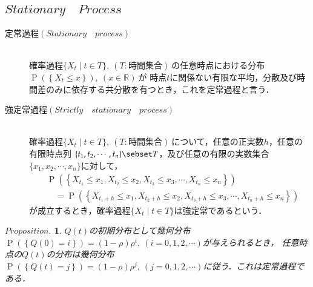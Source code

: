 \documentclass[a4j,papersize,disablejfam,slide,14pt]{jsarticle}
\newtheorem{Prop}{$Proposition.$}
\def\prob#1{\operatorname{P} \left(\left\{ #1 \right\}\right)} %
\begin{document}
\subsection{$Stationary\quad Process$}
	\begin{screen}
    	\begin{description}
        	\item[定常過程$(Stationary\quad process)$]\mbox{}\\
            	確率過程$\{ X_t \mid t \in T \},\ (T:\mbox{時間集合})\ $の任意時点における分布$\prob{X_t \leq x},\ (x \in \mathbb{R})\ $が
                時点$t$に関係ない有限な平均，分散及び時間差のみに依存する共分散を有つとき，これを定常過程と言う．
            \mbox{}\\
            \item[強定常過程$(Strictly\quad stationary\quad process)$]\mbox{}\\
            	確率過程$\{ X_t \mid t \in T \},\ (T:\mbox{時間集合})\ $について，任意の正実数$h$，任意の有限時点列
                $\{t_1, t_2, \cdots ,t_n\} \sebset T$，及び任意の有限の実数集合$\{x_1, x_2, \cdots ,x_n\}$に対して，
                \begin{align}
                	&\prob{X_t_1 \leq x_1, X_t_2 \leq x_2, X_t_3 \leq x_3, \cdots,X_t_n \leq x_n} \\
                    &\quad= \prob{X_{t_1+h} \leq x_1, X_{t_2+h} \leq x_2, X_{t_3+h} \leq x_3, \cdots,X_{t_n+h} \leq x_n}
                \end{align}
                が成立するとき，確率過程$\{ X_t \mid t \in T \}$は強定常であるという．
        \end{description}
    \end{screen}
	\begin{screen}
    	\begin{Prop}
    		$Q(t)$の初期分布として幾何分布$\prob{Q(0)=i}=(1-\rho)\rho^i,\ (i=0,1,2,\cdots)$が与えられるとき，
        	任意時点の$Q(t)$の分布は幾何分布$\prob{Q(t)=j}=(1-\rho)\rho^j,\ (j=0,1,2,\cdots)$に従う．これは定常過程である．
    	\end{Prop}
    \end{screen}
\end{document}
